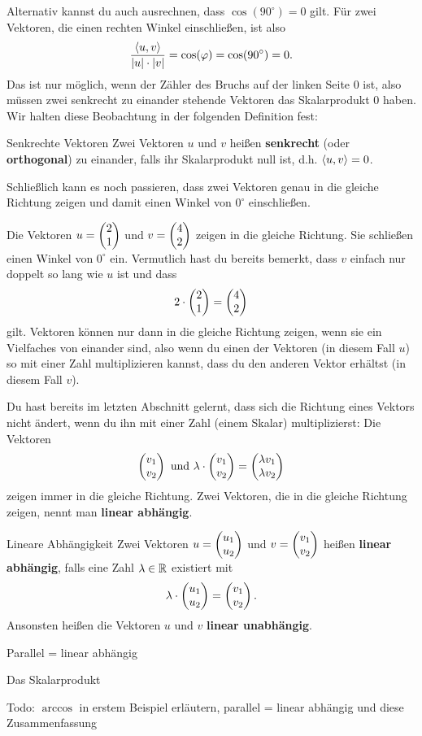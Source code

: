 \documentclass[../../main.tex]{subfiles}
\begin{document}
Alternativ kannst du auch ausrechnen, dass $\cos(90^\circ)=0$ gilt. Für zwei Vektoren, die einen rechten Winkel einschließen,
ist also
\[\frac{\langle u, v \rangle}{\lvert u\rvert\cdot\lvert v\rvert}=\cos(\varphi)=\cos(90^\circ)=0.\]
Das ist nur möglich, wenn der Zähler des Bruchs auf der linken Seite 0 ist, also müssen zwei senkrecht zu einander stehende
Vektoren das Skalarprodukt 0 haben. Wir halten diese Beobachtung in der folgenden Definition fest:
\begin{definition}{Senkrechte Vektoren}
    Zwei Vektoren $u$ und $v$ heißen \textbf{senkrecht} (oder \textbf{orthogonal}) zu einander, falls ihr Skalarprodukt
    null ist, d.h. $\langle u, v \rangle=0$.
\end{definition}
Schließlich kann es noch passieren, dass zwei Vektoren genau in die gleiche Richtung zeigen und damit einen Winkel von
$0^\circ$ einschließen.
\begin{example}{}
    Die Vektoren $u=\begin{pmatrix} 2\\ 1 \end{pmatrix}$ und $v=\begin{pmatrix} 4\\ 2 \end{pmatrix}$ zeigen in die gleiche Richtung. Sie schließen einen
    Winkel von $0^\circ$ ein. Vermutlich hast du bereits bemerkt, dass $v$ einfach nur doppelt so lang wie $u$ ist und
    dass
    \[2\cdot\begin{pmatrix} 2\\ 1 \end{pmatrix}=\begin{pmatrix} 4\\ 2 \end{pmatrix}\]
    gilt. Vektoren können nur dann in die gleiche Richtung zeigen, wenn sie ein Vielfaches von einander sind, also wenn
    du einen der Vektoren (in diesem Fall $u$) so mit einer Zahl multiplizieren kannst, dass du den anderen Vektor 
    erhältst (in diesem Fall $v$).
\end{example}
Du hast bereits im letzten Abschnitt gelernt, dass sich die Richtung eines Vektors nicht ändert, wenn du ihn mit einer
Zahl (einem Skalar) multiplizierst: Die Vektoren
\[\begin{pmatrix} v_1\\ v_2 \end{pmatrix}\text{ und }\lambda\cdot \begin{pmatrix} v_1\\ v_2 \end{pmatrix}=\begin{pmatrix} \lambda v_1\\ \lambda v_2 \end{pmatrix}\]
zeigen immer in die gleiche Richtung. Zwei Vektoren, die in die gleiche Richtung zeigen, nennt man \textbf{linear abhängig}.
\begin{definition}{Lineare Abhängigkeit}
    Zwei Vektoren $u=\begin{pmatrix} u_1\\ u_2 \end{pmatrix}$ und $v=\begin{pmatrix} v_1\\ v_2 \end{pmatrix}$ heißen \textbf{linear abhängig}, falls eine Zahl 
    $\lambda\in\mathbb{R}$ existiert mit
    \[\lambda\cdot\begin{pmatrix} u_1\\ u_2 \end{pmatrix}=\begin{pmatrix} v_1\\ v_2 \end{pmatrix}.\]
    Ansonsten heißen die Vektoren $u$ und $v$ \textbf{linear unabhängig}.
\end{definition}
\begin{example}{Parallel = linear abhängig}

\end{example}

\begin{nutshell}{Das Skalarprodukt}
    
\end{nutshell}
    Todo: $\arccos$ in erstem Beispiel erläutern, parallel = linear abhängig und diese Zusammenfassung
\end{document}

